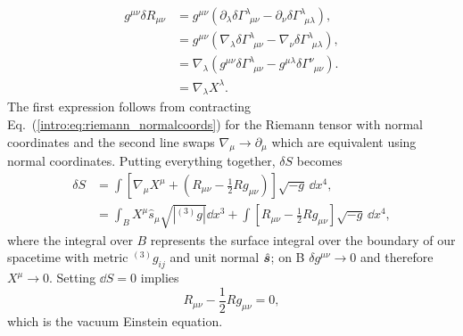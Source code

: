 \begin{align}
g^{\mu\nu} \delta R_{\mu\nu} &= g^{\mu\nu}\left( \partial_\lambda \delta\Gamma^{\lambda}_{\,\,\,\mu\nu} - \partial_\nu \delta\Gamma^{\lambda}_{\,\,\,\mu\lambda} \right), \\
&= g^{\mu\nu}\left( \nabla_\lambda \delta\Gamma^{\lambda}_{\,\,\,\mu\nu} - \nabla_\nu \delta\Gamma^{\lambda}_{\,\,\,\mu\lambda} \right), \\
&= \nabla_\lambda \left( g^{\mu\nu} \delta\Gamma^{\lambda}_{\,\,\,\mu\nu} - g^{\mu\lambda} \delta\Gamma^{\nu}_{\,\,\,\mu\nu} \right). \\
&=\nabla_\lambda X^\lambda.
\end{align}
The first expression follows from contracting Eq.~(\ref{intro:eq:riemann_normalcoords}) for the Riemann tensor with normal coordinates and the second line swaps $\nabla_\mu \rightarrow \partial_\mu$ which are equivalent using normal coordinates. Putting everything together, $\delta S$ becomes
\begin{align}
\delta S &= \int \left[ \nabla_\mu X^\mu + \left( R_{\mu\nu}-\frac{1}{2}Rg_{\mu\nu}\right)\right]\sqrt{-g}\,\dd x^4, \\
&= \int_B X^\mu \hat{s}_\mu \sqrt{|{}^{(3)}g|}\dd x^3 + \int \left[  R_{\mu\nu}-\frac{1}{2}Rg_{\mu\nu}\right]\sqrt{-g}\,\dd x^4,
\end{align}
where the integral over $B$ represents the surface integral over the boundary of our spacetime with metric ${}^{(3)}g_{ij}$ and unit normal $\hat{\boldsymbol{s}}$; on B $\delta g^{\mu\nu}\rightarrow 0 $ and therefore $X^\mu \rightarrow 0$. Setting $\dd S =0$ implies
\begin{equation}
R_{\mu\nu}-\frac{1}{2}Rg_{\mu\nu}=0,
\end{equation}
which is the vacuum Einstein equation.


